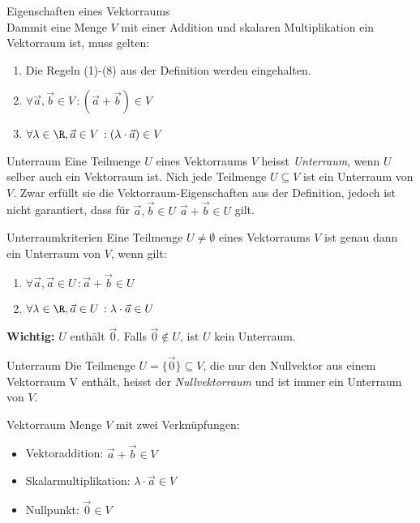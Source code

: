     \begin{theorem}{Eigenschaften eines Vektorraums}\\
        Dammit eine Menge $V$ mit einer Addition und skalaren Multiplikation ein Vektorraum ist, muss gelten:
        \begin{enumerate}
            \item Die Regeln (1)-(8) aus der Definition werden eingehalten.
            \item $\forall \vec{a},\vec{b}\in V\,:(\vec{a}+\vec{b})\in V$
            \item $\forall \lambda\in \R, \vec{a}\in V\,:(\lambda\cdot\vec{a})\in V$
        \end{enumerate}
    \end{theorem}

    \begin{definition}{Unterraum}
        Eine Teilmenge $U$ eines Vektorraums $V$ heisst \textit{Unterraum}, wenn $U$ selber auch ein Vektorraum ist.
        Nich jede Teilmenge $U\subseteq V$ ist ein Unterraum von $V$. Zwar erfüllt sie die Vektorraum-Eigenschaften
        aus der Definition, jedoch ist nicht garantiert, dass für $\vec{a},\vec{b}\in U$ $\vec{a}+\vec{b}\in U$ gilt. 
    \end{definition}

    \begin{theorem}{Unterraumkriterien}
        Eine Teilmenge $U\neq\emptyset$ eines Vektorraums $V$ ist genau dann ein Unterraum von $V$, wenn gilt:
        \begin{enumerate}
            \item $\forall \vec{a},\vec{a}\in U\,:\vec{a}+\vec{b}\in U$
            \item $\forall \lambda\in\R,\vec{a}\in U\,:\lambda\cdot\vec{a}\in U$
        \end{enumerate}
        \textbf{Wichtig:} $U$ enthält $\vec{0}$. Falls $\vec{0}\notin U$, ist $U$ kein Unterraum. 
    \end{theorem}

    \begin{definition}{Unterraum}
        Die Teilmenge $U=\{\vec{0}\}\subseteq V$, die nur den Nullvektor aus einem Vektorraum V enthält, 
        heisst der \textit{Nullvektorraum} und ist immer ein Unterraum von $V$.
    \end{definition}

\begin{definition}{Vektorraum}
    Menge $V$ mit zwei Verknüpfungen:
    \begin{itemize}
        \item Vektoraddition: $\overrightarrow{a} + \overrightarrow{b} \in V$
        \item Skalarmultiplikation: $\lambda \cdot \overrightarrow{a} \in V$
        \item Nullpunkt: $\overrightarrow{0} \in V$
    \end{itemize}
\end{definition}

